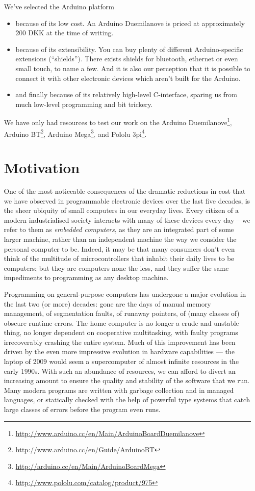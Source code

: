 \documentclass[a4paper, oneside, final]{memoir}
\begin{document}
\noindent
We've selected the Arduino platform 
\begin{itemize}
\item because of its low cost. An Arduino Duemilanove is priced at
  approximately 200 \nolinebreak DKK at the time of writing.
\item because of its extensibility. You can buy plenty of different
  Arduino-specific extensions (``shields''). There exists shields for
  bluetooth, ethernet or even small touch, to name a few. And it is also
  our perception that it is possible to connect it with other
  electronic devices which aren't built for the Arduino.
\item and finally because of its relatively high-level C-interface,
  sparing us from much low-level programming and bit trickery.
\end{itemize}

We have only had resources to test our work on the Arduino
Duemilanove\footnote{\url{http://www.arduino.cc/en/Main/ArduinoBoardDuemilanove}},
Arduino BT\footnote{\url{http://www.arduino.cc/en/Guide/ArduinoBT}},
Arduino
Mega\footnote{\url{http://arduino.cc/en/Main/ArduinoBoardMega}}, and
Pololu 3pi\footnote{\url{http://www.pololu.com/catalog/product/975}}.

\section{Motivation}
One of the most noticeable consequences of the dramatic reductions in
cost that we have observed in programmable electronic devices over the
last five decades, is the sheer ubiquity of small computers in our
everyday lives.  Every citizen of a modern industrialised society
interacts with many of these devices every day -- we refer to them as
\textit{embedded computers}, as they are an integrated part of some
larger machine, rather than an independent machine the way we consider
the personal computer to be.  Indeed, it may be that many consumers
don't even think of the multitude of microcontrollers that inhabit
their daily lives to be computers; but they are computers none the
less, and they suffer the same impediments to programming as any
desktop machine.

Programming on general-purpose computers has undergone a major
evolution in the last two (or more) decades: gone are the days of
manual memory management, of segmentation faults, of runaway pointers,
of (many classes of) obscure runtime-errors.  The home computer is no
longer a crude and unstable thing, no longer dependent on cooperative
multitasking, with faulty programs irrecoverably crashing the entire
system.  Much of this improvement has been driven by the even more
impressive evolution in hardware capabilities --- the laptop of 2009
would seem a supercomputer of almost infinite resources in the early
1990s.  With such an abundance of resources, we can afford to divert
an increasing amount to ensure the quality and stability of the
software that we run.  Many modern programs are written with garbage
collection and in managed languages, or statically checked with the
help of powerful type systems that catch large classes of errors
before the program even runs.
\end{document}
